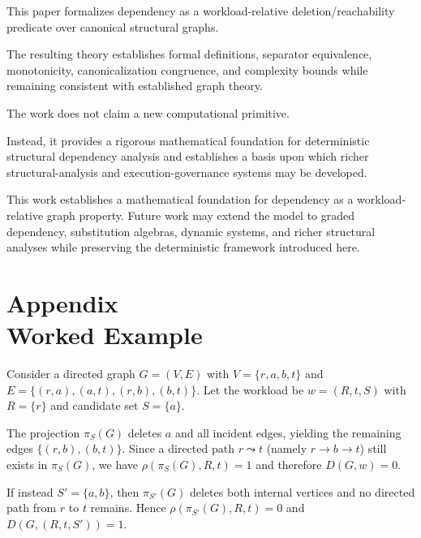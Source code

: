 \documentclass[11pt]{article}
\begin{document}
This paper formalizes dependency as a workload-relative
deletion/reachability predicate over canonical structural graphs.

The resulting theory establishes formal definitions, separator
equivalence, monotonicity, canonicalization congruence, and complexity
bounds while remaining consistent with established graph theory.

The work does not claim a new computational primitive.

Instead, it provides a rigorous mathematical foundation for
deterministic structural dependency analysis and establishes a basis
upon which richer structural-analysis and execution-governance systems
may be developed.

This work establishes a mathematical foundation for dependency as a workload-relative graph property. Future work may extend the model to graded dependency, substitution algebras, dynamic systems, and richer structural analyses while preserving the deterministic framework introduced here.

\appendix

\section*{Appendix \thesection\\Worked Example}
\label{app:worked-example}
Consider a directed graph $G=(V,E)$ with $V=\{r,a,b,t\}$ and
$E=\{(r,a),(a,t),(r,b),(b,t)\}$. Let the workload be $w=(R,t,S)$ with
$R=\{r\}$ and candidate set $S=\{a\}$.

The projection $\pi_S(G)$ deletes $a$ and all incident edges, yielding the remaining edges $\{(r,b),(b,t)\}$. Since a directed path $r\leadsto t$ (namely $r\to b\to t$) still exists in $\pi_S(G)$, we have $\rho(\pi_S(G),R,t)=1$ and therefore $D(G,w)=0$.

If instead $S'=\{a,b\}$, then $\pi_{S'}(G)$ deletes both internal vertices and no directed path from $r$ to $t$ remains. Hence $\rho(\pi_{S'}(G),R,t)=0$ and $D(G,(R,t,S'))=1$.

\end{document}
